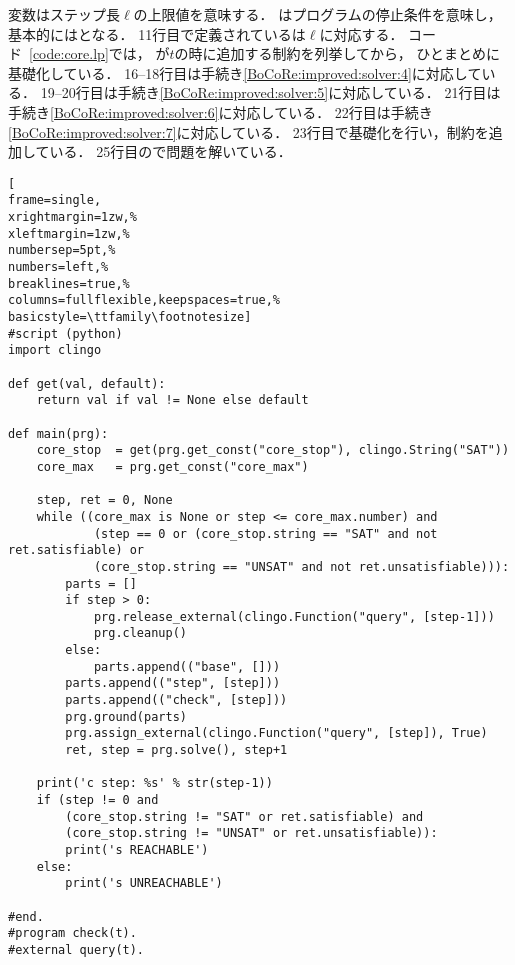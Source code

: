 変数はステップ長$\ell$の上限値を意味する．
はプログラムの停止条件を意味し，
基本的にはとなる．
11行目で定義されているは$\ell$に対応する．
コード~\ref{code:core.lp}では，
が$t$の時に追加する制約を列挙してから，
ひとまとめに基礎化している．
16--18行目は手続き\ref{BoCoRe:improved:solver:4}に対応している．
19--20行目は手続き\ref{BoCoRe:improved:solver:5}に対応している．
21行目は手続き\ref{BoCoRe:improved:solver:6}に対応している．
22行目は手続き\ref{BoCoRe:improved:solver:7}に対応している．
23行目で基礎化を行い，制約を追加している．
25行目ので問題を解いている．



% 


\begin{figure*}[t]
\centering  
\begin{lstlisting}[
frame=single,
xrightmargin=1zw,% 
xleftmargin=1zw,% 
numbersep=5pt,%
numbers=left,%
breaklines=true,%
columns=fullflexible,keepspaces=true,%
basicstyle=\ttfamily\footnotesize]
#script (python) 
import clingo

def get(val, default):
    return val if val != None else default

def main(prg):
    core_stop  = get(prg.get_const("core_stop"), clingo.String("SAT"))
    core_max   = prg.get_const("core_max")

    step, ret = 0, None
    while ((core_max is None or step <= core_max.number) and
            (step == 0 or (core_stop.string == "SAT" and not ret.satisfiable) or
            (core_stop.string == "UNSAT" and not ret.unsatisfiable))):    
        parts = []
        if step > 0:
            prg.release_external(clingo.Function("query", [step-1]))
            prg.cleanup()
        else:
            parts.append(("base", []))
        parts.append(("step", [step]))
        parts.append(("check", [step]))
        prg.ground(parts)
        prg.assign_external(clingo.Function("query", [step]), True)
        ret, step = prg.solve(), step+1

    print('c step: %s' % str(step-1))
    if (step != 0 and
        (core_stop.string != "SAT" or ret.satisfiable) and
        (core_stop.string != "UNSAT" or ret.unsatisfiable)):
        print('s REACHABLE')
    else:
        print('s UNREACHABLE')

#end.
#program check(t).
#external query(t).
\end{lstlisting}
\caption{{\clingo}の Python API を用いた有界組合せ遷移ソルバーの実装 ()}
\label{code:core.lp}
\end{figure*}



